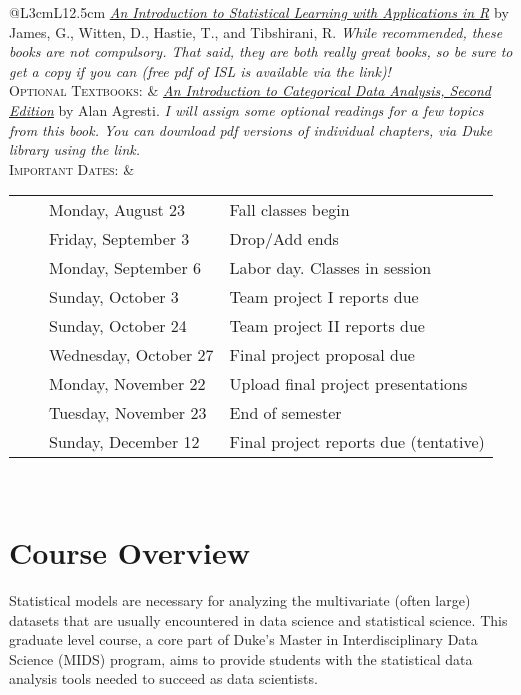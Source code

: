 \documentclass[11pt, a4paper]{article}
\newcommand{\tabitem}{~~\llap{\textbullet}~~}
\begin{document}
\begin{center}
\begin{minipage}[t]{.95\textwidth}
\begin{tabular}{@{}L{3cm}L{12.5cm}}
\newline  \href{https://www.statlearning.com}{\textit{An Introduction to Statistical Learning with Applications in R}} by James, G., Witten, D., Hastie, T., and Tibshirani, R.
\newline \textit{While recommended, these books are not compulsory. That said, they are both really great books, so be sure to get a copy if you can (free pdf of ISL is available via the link)!}\\ 
\textsc{Optional Textbooks:}	& \href{https://find.library.duke.edu/catalog/DUKE005142588}{\textit{An Introduction to Categorical Data Analysis, Second Edition}} by Alan Agresti.
\newline \textit{I will assign some optional readings for a few topics from this book. You can download pdf versions of individual chapters, via Duke library using the link.}\\ 
\textsc{Important Dates:} & \begin{minipage}[t]{.95\textwidth}
	\begin{tabular}{@{}ll}
		\tabitem Monday, August 23	& Fall classes begin \\
		\tabitem Friday, September 3	& Drop/Add ends \\
		\tabitem Monday, September 6 & Labor day. Classes in session \\
		\tabitem Sunday, October 3 & Team project I reports due \\
		\tabitem Sunday, October 24 & Team project II reports due \\
		\tabitem Wednesday, October 27 & Final project proposal due \\
		\tabitem Monday, November 22 & Upload final project presentations \\
		\tabitem Tuesday, November 23 &	End of semester \\
		\tabitem Sunday, December 12 &	Final project reports due (tentative) \\
	\end{tabular}
\end{minipage} \\
	 \bottomrule[0.065cm]
\end{tabular}
\end{minipage}
\end{center}


\vspace{.5cm}
\setlength{\unitlength}{1in}
\renewcommand{\arraystretch}{1.5}



\section{Course Overview}
Statistical models are necessary for analyzing the multivariate (often large) datasets that are usually encountered in data science and statistical science. This graduate level course, a core part of Duke's Master in Interdisciplinary Data Science (MIDS) program, aims to provide students with the statistical data analysis tools needed to succeed as data scientists. 
\end{document}
